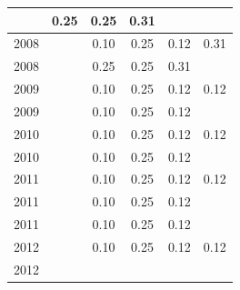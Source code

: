 \begin{table}[H]
\begin{tabular}{| l | c | c | c | c | c |}
          &
          0.25
          &
          0.25
          &
          0.31
          &
          \\
\hline
            2008
          &
          
          &
          0.10
          &
          0.25
          &
          0.12
          &
            {\color{red} 0.31}
          \\
            2008
          &
          
          &
          0.25
          &
          0.25
          &
          0.31
          &
          \\
\hline
            2009
          &
          
          &
          0.10
          &
          0.25
          &
          0.12
          &
            {\color{red} 0.12}
          \\
            2009
          &
          
          &
          0.10
          &
          0.25
          &
          0.12
          &
          \\
\hline
            2010
          &
          
          &
          0.10
          &
          0.25
          &
          0.12
          &
            {\color{red} 0.12}
          \\
            2010
          &
          
          &
          0.10
          &
          0.25
          &
          0.12
          &
          \\
\hline
            2011
          &
          
          &
          0.10
          &
          0.25
          &
          0.12
          &
            {\color{red} 0.12}
          \\
            2011
          &
          
          &
          0.10
          &
          0.25
          &
          0.12
          &
          \\
            2011
          &
          
          &
          0.10
          &
          0.25
          &
          0.12
          &
          \\
\hline
            2012
          &
          
          &
          0.10
          &
          0.25
          &
          0.12
          &
            {\color{red} 0.12}
          \\
            2012
          &
          

\end{tabular}
\end{table}
